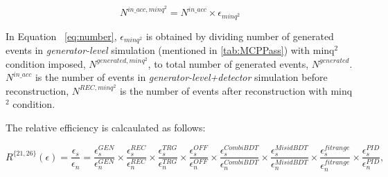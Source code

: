 \begin{equation}
N^{in\_acc,minq^{2}} = N^{in\_acc} \times \epsilon_{minq^{2}}
\label{eq:number}
\end{equation}

In Equation ~\ref{eq:number}, $\epsilon_{minq^{2}}$ is obtained by dividing number of generated events in \textit{generator-level} simulation (mentioned in \autoref{tab:MCPPass}) with minq$^2$ condition imposed, $N^{generated,minq^{2}}$, to total number of generated events, $N^{generated}$. $N^{in\_acc}$ is the number of events in \textit{generator-level+detector} simulation before reconstruction, $N^{REC,minq^{2}}$ is the number of events after reconstruction with minq$^2$ condition.

The relative efficiency is calcaulated as follows:


\hspace*{-1.0cm}\begin{equation}
R^{\{21,26\}}(\epsilon)=\frac{\epsilon_{s}}{\epsilon_{n}}=\frac{\epsilon^{GEN}_{s}}{\epsilon^{GEN}_{n}} \times \frac{\epsilon^{REC}_{s}}{\epsilon^{REC}_{n}} \times \frac{\epsilon^{TRG}_{s}}{\epsilon^{TRG}_{n}} \times \frac{\epsilon^{OFF}_{s}}{\epsilon^{OFF}_{n}} \times \frac{\epsilon^{CombiBDT}_{s}}{\epsilon^{CombiBDT}_{n}} \times \frac{\epsilon^{MisidBDT}_{s}}{\epsilon^{MisidBDT}_{n}} \times \frac{\epsilon^{fitrange}_{s}}{\epsilon^{fitrange}_{n}} \times \frac{\epsilon^{PID}_{s}}{\epsilon^{PID}_{n}},
\label{eq:notsplitted}
\end{equation}


